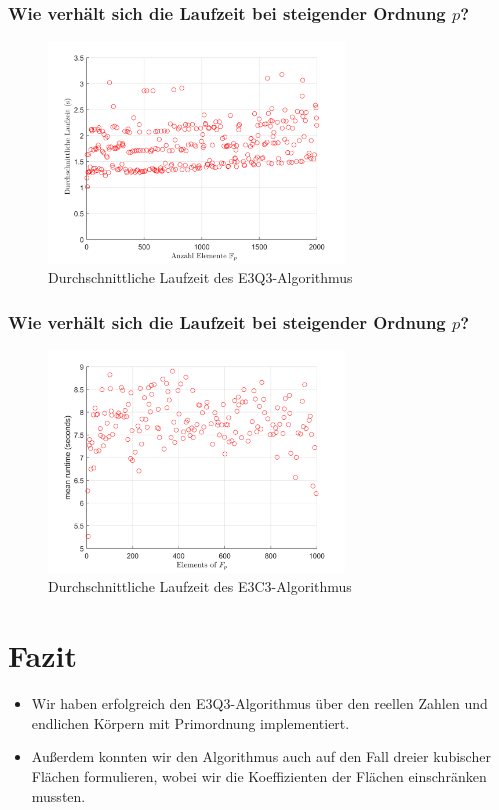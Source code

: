 \documentclass[11pt]{beamer}
\theoremstyle{custom}
\theoremstyle{custom}
\begin{document}
	\begin{frame}
		\frametitle{Wie verhält sich die Laufzeit bei steigender Ordnung $p$?}
		\begin{figure}[H]
			\includegraphics[width=0.7\textwidth]{"images/runtime_e3q3.png"}
			\caption{Durchschnittliche Laufzeit des E3Q3-Algorithmus}
		\end{figure}
	\end{frame}
	\begin{frame}
		\frametitle{Wie verhält sich die Laufzeit bei steigender Ordnung $p$?}
		\begin{figure}[H]
			\includegraphics[width=0.7\textwidth]{"images/runtime_e3c3_2.png"}
			\caption{Durchschnittliche Laufzeit des E3C3-Algorithmus}
		\end{figure}
	\end{frame}
	\section{Fazit}
	\begin{frame}
		\begin{itemize}
			\frametitle{Fazit}
			\pause
			\item Wir haben erfolgreich den E3Q3-Algorithmus über den reellen Zahlen und endlichen Körpern mit Primordnung implementiert.
			\pause
			\item Außerdem konnten wir den Algorithmus auch auf den Fall dreier kubischer Flächen formulieren, wobei wir die Koeffizienten der Flächen einschränken mussten.
		\end{itemize}
	\end{frame}
\end{document}
